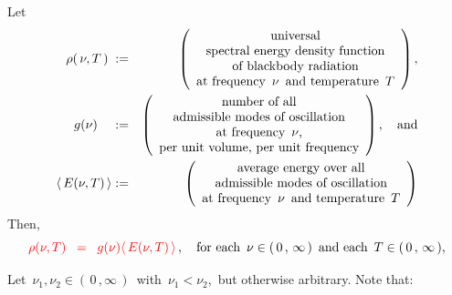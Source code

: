 \vskip 0.3cm
\begin{proposition} %
\mbox{}
\vskip 0.2cm
\noindent
Let
\begin{eqnarray*}
\rho(\,\nu,T\,)
{\color{white}.}
& := &
    \left(\begin{array}{c}
        \textnormal{universal}
        \\
        \textnormal{spectral energy density function}
        \\
        \textnormal{of blackbody radiation}
        \\
        \textnormal{at frequency \,$\nu$\, and temperature \,$T$}
        \end{array}\right),
\\
g(\nu)
{\color{white}....}
& := &
    \left(\begin{array}{c}
        \textnormal{number of all}
        \\
        \textnormal{admissible modes of oscillation}
        \\
        \textnormal{at frequency \,$\nu$,}
        \\
        \textnormal{per unit volume, per unit frequency}
        \end{array}\right),
    \quad
    \textnormal{and}
\\
\langle\,E(\nu,T)\,\rangle
& := &
    \left(\begin{array}{c}
        \textnormal{average energy over all}
        \\
        \textnormal{admissible modes of oscillation}
        \\
        \textnormal{at frequency \,$\nu$\, and temperature \,$T$}
        \end{array}\right)
\end{eqnarray*}
Then,
\begin{equation*}
{\color{red}
\rho(\nu,T)
\;\; = \;\;
    g(\nu) \langle\,E(\nu,T)\,\rangle}\,,
\quad
\textnormal{for each \,$\nu \in (\,0\,,\,\infty\,)$\, and each \,$T \in (\,0\,,\,\infty\,)$},
\end{equation*}
\end{proposition}
\proof
Let \,$\nu_{1}, \nu_{2} \in (\,0\,,\infty\,)$\,
with \,$\nu_{1} < \nu_{2}$,\, but otherwise arbitrary.
Note that:
